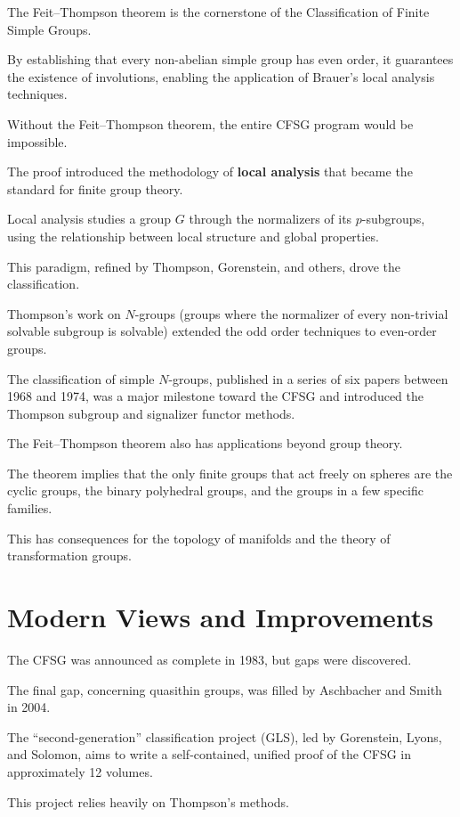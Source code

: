 The Feit--Thompson theorem is the cornerstone of the Classification of Finite Simple Groups.

By establishing that every non-abelian simple group has even order, it guarantees the existence of involutions, enabling the application of Brauer's local analysis techniques.

Without the Feit--Thompson theorem, the entire CFSG program would be impossible.

The proof introduced the methodology of \textbf{local analysis} that became the standard for finite group theory.

Local analysis studies a group $G$ through the normalizers of its $p$-subgroups, using the relationship between local structure and global properties.

This paradigm, refined by Thompson, Gorenstein, and others, drove the classification.

Thompson's work on $N$-groups (groups where the normalizer of every non-trivial solvable subgroup is solvable) extended the odd order techniques to even-order groups.

The classification of simple $N$-groups, published in a series of six papers between 1968 and 1974, was a major milestone toward the CFSG and introduced the Thompson subgroup and signalizer functor methods.

The Feit--Thompson theorem also has applications beyond group theory.

The theorem implies that the only finite groups that act freely on spheres are the cyclic groups, the binary polyhedral groups, and the groups in a few specific families.

This has consequences for the topology of manifolds and the theory of transformation groups.

\section{Modern Views and Improvements}

The CFSG was announced as complete in 1983, but gaps were discovered.

The final gap, concerning quasithin groups, was filled by Aschbacher and Smith in 2004.

The ``second-generation'' classification project (GLS), led by Gorenstein, Lyons, and Solomon, aims to write a self-contained, unified proof of the CFSG in approximately 12 volumes.

This project relies heavily on Thompson's methods.

